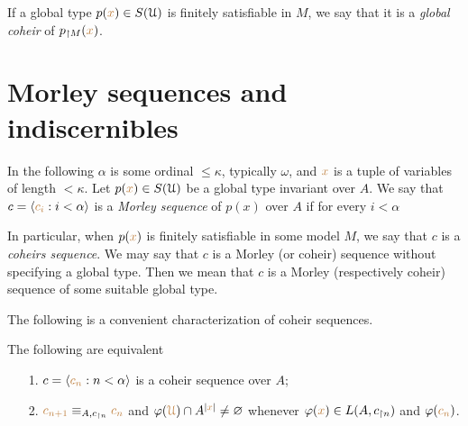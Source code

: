 \documentclass[creche.tex]{subfiles}
\begin{document}
If a global type $p({\color{brown} x})\in S(\EuScript U)$ is finitely satisfiable in $M$, we say that it is a \emph{global coheir\/} of $p_{\restriction M}({\color{brown} x})$.

% 


\section{Morley sequences and indiscernibles}


In the following $\alpha$ is some ordinal $\le\kappa$, typically $\omega$, and ${\color{brown} x}$ is a tuple of variables of length $<\kappa$. Let \mbox{$p({\color{brown} x})\in S(\EuScript U)$} be a global type invariant over $A$.   We say that $c=\langle{\color{brown}c_i}:i<\alpha\rangle$ is a \emph{Morley sequence\/} of $p(x)$ over $A$ if for every $i<\alpha$


In particular, when $p({\color{brown} x})$ is finitely satisfiable in some model $M$, we say that $c$ is a \emph{coheirs sequence}. We may say that $c$ is a Morley (or coheir) sequence without specifying a global type. Then we mean that $c$ is a Morley (respectively coheir) sequence of some suitable global type.

The following is a convenient characterization of coheir sequences.

\begin{lemma}\label{lem_coheir_property}
The following are equivalent
\begin{itemize}
\item[1.] $c=\langle{\color{brown}c_n}:n<\alpha\rangle$ is a coheir sequence over $A$;
\item[2.] ${\color{brown} c_{n+1}}\equiv_{A,c_{\restriction n}}{\color{brown} c_n}$ and $\varphi({\color{brown}\EuScript U})\cap A^{|{\color{brown} x}|}\neq\varnothing$ whenever $\varphi({\color{brown} x})\in L(A,c_{\restriction n})$ and  $\varphi({\color{brown} c_n})$.
\end{itemize}
\end{lemma}
\end{document}
